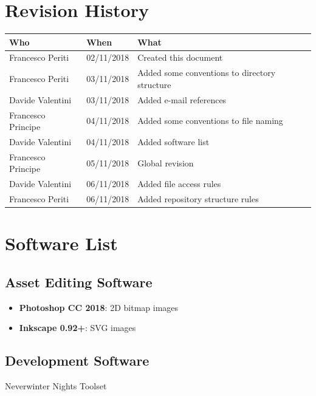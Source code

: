 \documentclass[12pt]{article}
\begin{document}
\clearpage

\section*{Revision History}
\begin{table}[H]
\centering
  \begin{tabularx}{\textwidth}{|l|l|X|}
\hline
\cellcolor{lightgray}\textbf{Who} & \cellcolor{lightgray}\textbf{When} & \cellcolor{lightgray}\textbf{What} \\ \hline
Francesco Periti & 02/11/2018 & Created this document \\ \hline
Francesco Periti & 03/11/2018 & Added some conventions to directory structure \\ \hline
Davide Valentini & 03/11/2018 & Added e-mail references \\ \hline
Francesco Principe & 04/11/2018 & Added some conventions to file naming \\ \hline
Davide Valentini & 04/11/2018 & Added software list \\ \hline
Francesco Principe & 05/11/2018 & Global revision \\ \hline
Davide Valentini & 06/11/2018 & Added file access rules \\ \hline
Francesco Periti & 06/11/2018 & Added repository structure rules \\ \hline
\end{tabularx}
\end{table}

\clearpage

\section{Software List}

\subsection{Asset Editing Software}
\begin{itemize}
	\item \textbf{Photoshop CC 2018}: 2D bitmap images
	\item \textbf{Inkscape 0.92+}: SVG images
\end{itemize}

\subsection{Development Software}
Neverwinter Nights Toolset
\end{document}
